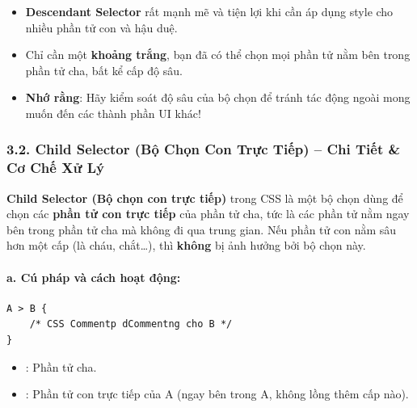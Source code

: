 \begin{tipBox}
\begin{itemize}[leftmargin=1.5em, itemsep=3pt, parsep=0pt]
    \item \textbf{Descendant Selector} rất mạnh mẽ và tiện lợi khi cần áp dụng style cho nhiều phần tử con và hậu duệ.
    \item Chỉ cần một \textbf{khoảng trắng}, bạn đã có thể chọn mọi phần tử nằm bên trong phần tử cha, bất kể cấp độ sâu.
    \item \textbf{Nhớ rằng}: Hãy kiểm soát độ sâu của bộ chọn để tránh tác động ngoài mong muốn đến các thành phần UI khác!
\end{itemize}
\end{tipBox}

\subsubsection{3.2. Child Selector (Bộ Chọn Con Trực Tiếp) -- Chi Tiết \& Cơ Chế Xử Lý}

\begin{conceptBox}
\textbf{Child Selector (Bộ chọn con trực tiếp)} trong CSS là một bộ chọn dùng để chọn các \textbf{phần tử con trực tiếp} của phần tử cha, tức là các phần tử nằm ngay bên trong phần tử cha mà không đi qua trung gian. Nếu phần tử con nằm sâu hơn một cấp (là cháu, chắt\ldots), thì \textbf{không} bị ảnh hưởng bởi bộ chọn này.
\end{conceptBox}

\paragraph{a. Cú pháp và cách hoạt động:}
\begin{codeWindow}
\begin{lstlisting}[language=CSS3]
A > B {
    /* CSS Commentp dCommentng cho B */
}
\end{lstlisting}
\end{codeWindow}

\begin{itemize}[leftmargin=1.5em, itemsep=2pt, parsep=0pt]
    \item {}: Phần tử cha.
    \item {}: Phần tử con trực tiếp của A (ngay bên trong A, không lồng thêm cấp nào).
\end{itemize}

